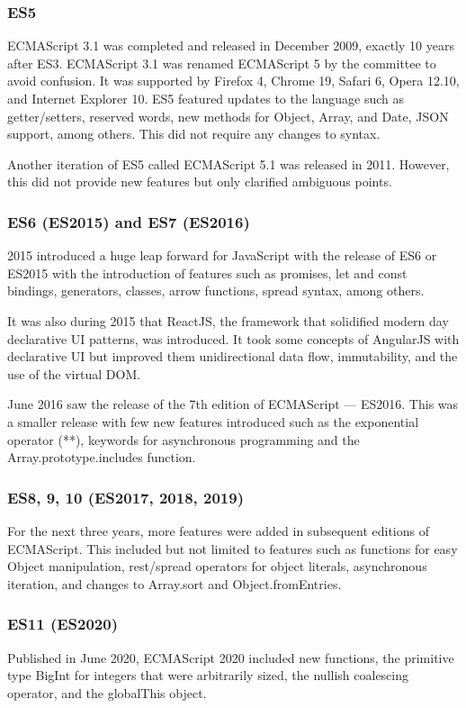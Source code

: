 \documentclass{article}
\begin{document}
  \subsubsection{ES5}
  ECMAScript 3.1 was completed and released in December 2009, exactly 10 years
  after ES3. ECMAScript 3.1 was renamed ECMAScript 5 by the committee to avoid
  confusion. It was supported by Firefox 4, Chrome 19, Safari 6, Opera 12.10,
  and Internet Explorer 10. ES5 featured updates to the language such as
  getter/setters, reserved words, new methods for Object, Array, and Date, JSON
  support, among others. This did not require any changes to syntax.

  Another iteration of ES5 called ECMAScript 5.1 was released in 2011. However,
  this did not provide new features but only clarified ambiguous points.

  \subsubsection{ES6 (ES2015) and ES7 (ES2016)}
  2015 introduced a huge leap forward for JavaScript with the release of ES6 or
  ES2015 with the introduction of features such as promises, let and const
  bindings, generators, classes, arrow functions, spread syntax, among others.

  It was also during 2015 that ReactJS, the framework that solidified modern day
  declarative UI patterns, was introduced. It took some concepts of AngularJS
  with declarative UI but improved them unidirectional data flow, immutability,
  and the use of the virtual DOM.\@

  June 2016 saw the release of the 7th edition of ECMAScript --- ES2016. This
  was a smaller release with few new features introduced such as the exponential
  operator (**), keywords for asynchronous programming and the
  Array.prototype.includes function.

  \subsubsection{ES8, 9, 10 (ES2017, 2018, 2019)}
  For the next three years, more features were added in subsequent editions of
  ECMAScript. This included but not limited to features such as functions for
  easy Object manipulation, rest/spread operators for object literals,
  asynchronous iteration, and changes to Array.sort and Object.fromEntries.

  \subsubsection{ES11 (ES2020)}
  Published in June 2020, ECMAScript 2020 included new functions, the primitive
  type BigInt for integers that were arbitrarily sized, the nullish coalescing
  operator, and the globalThis object.
\end{document}
